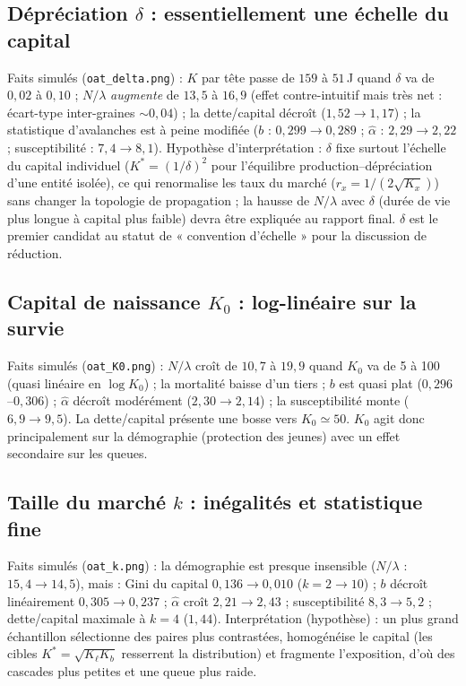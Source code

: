 \documentclass[11pt,a4paper]{article}
\newcommand{\code}[1]{\texttt{#1}}
\begin{document}
\subsection{Dépréciation $\delta$ : essentiellement une échelle du capital}

Faits simulés (\code{oat\_delta.png}) : $K$ par tête passe de $159$ à
$51$\,J quand $\delta$ va de $0{,}02$ à $0{,}10$ ; $N/\lambda$
\emph{augmente} de $13{,}5$ à $16{,}9$ (effet contre-intuitif mais très
net : écart-type inter-graines $\sim0{,}04$) ; la dette/capital décroît
($1{,}52\to1{,}17$) ; la statistique d'avalanches est à peine modifiée
($b$ : $0{,}299\to0{,}289$ ; $\hat\alpha$ : $2{,}29\to2{,}22$ ;
susceptibilité : $7{,}4\to8{,}1$). Hypothèse d'interprétation : $\delta$
fixe surtout l'échelle du capital individuel
($K^\ast=(1/\delta)^2$ pour l'équilibre production--dépréciation d'une
entité isolée), ce qui renormalise les taux du marché
($r_x=1/(2\sqrt{K_x})$) sans changer la topologie de propagation ; la
hausse de $N/\lambda$ avec $\delta$ (durée de vie plus longue à capital
plus faible) devra être expliquée au rapport final. $\delta$ est le
premier candidat au statut de « convention d'échelle » pour la
discussion de réduction.

\subsection{Capital de naissance $K_0$ : log-linéaire sur la survie}

Faits simulés (\code{oat\_K0.png}) : $N/\lambda$ croît de $10{,}7$ à
$19{,}9$ quand $K_0$ va de 5 à 100 (quasi linéaire en $\log K_0$) ; la
mortalité baisse d'un tiers ; $b$ est quasi plat
($0{,}296$--$0{,}306$) ; $\hat\alpha$ décroît modérément
($2{,}30\to2{,}14$) ; la susceptibilité monte ($6{,}9\to9{,}5$). La
dette/capital présente une bosse vers $K_0\simeq50$. $K_0$ agit donc
principalement sur la démographie (protection des jeunes) avec un effet
secondaire sur les queues.

\subsection{Taille du marché $k$ : inégalités et statistique fine}

Faits simulés (\code{oat\_k.png}) : la démographie est presque
insensible ($N/\lambda$ : $15{,}4\to14{,}5$), mais : Gini du capital
$0{,}136\to0{,}010$ ($k=2\to10$) ; $b$ décroît linéairement
$0{,}305\to0{,}237$ ; $\hat\alpha$ croît $2{,}21\to2{,}43$ ;
susceptibilité $8{,}3\to5{,}2$ ; dette/capital maximale à $k=4$
($1{,}44$). Interprétation (hypothèse) : un plus grand échantillon
sélectionne des paires plus contrastées, homogénéise le capital
(les cibles $K^\ast=\sqrt{K_\ell K_b}$ resserrent la distribution) et
fragmente l'exposition, d'où des cascades plus petites et une queue plus
raide.
\end{document}
